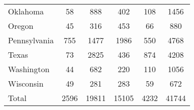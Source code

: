 \begin{tabular}{l*{5}{c}}
Oklahoma    &          58&         888&         402&         108&        1456\\
Oregon      &          45&         316&         453&          66&         880\\
Pennsylvania&         755&        1477&        1986&         550&        4768\\
Texas       &          73&        2825&         436&         874&        4208\\
Washington  &          44&         682&         220&         110&        1056\\
Wisconsin   &          49&         281&         283&          59&         672\\
Total       &        2596&       19811&       15105&        4232&       41744\\
\bottomrule
\end{tabular}
